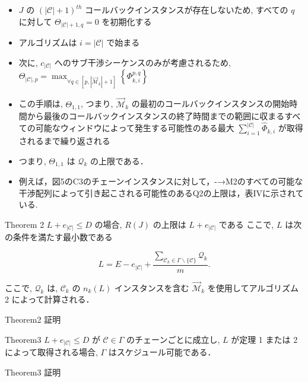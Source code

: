 \begin{frame}{}
    \begin{itemize}
        \item $J$ の $(|\mathcal{C}|+1)^{t h}$ コールバックインスタンスが存在しないため, すべての $q$ に対して $\Theta_{|\mathcal{C}|+1, q}=0$ を初期化する
        \item アルゴリズムは $i=|\mathcal{C}|$ で始まる
        \item 次に, $c_{|\mathcal{C}|}$ へのサブ干渉シーケンスのみが考慮されるため, $\Theta_{|\mathcal{C}|, p}=\max _{\forall q \in\left[p,\left|\overrightarrow{\mathcal{M}}_{k}\right|+1\right]}\left\{\Phi_{k, i}^{p, q}\right\}$
        \item この手順は, $\Theta_{1,1}$, つまり, $\overrightarrow{\mathcal{M}}_{k}$ の最初のコールバックインスタンスの開始時間から最後のコールバックインスタンスの終了時間までの範囲に収まるすべての可能なウィンドウによって発生する可能性のある最大 $\sum_{i=1}^{|\mathcal{C}|} \hat{\Phi}_{k, i}$ が取得されるまで繰り返される
        \item つまり, $\Theta_{1,1}$ は $\mathcal{Q}_{k}$ の上限である．
    \end{itemize}
\end{frame}

\begin{frame}{}
    \begin{itemize}
        \item 例えば，図5のC3のチェーンインスタンスに対して，-→M2のすべての可能な干渉配列によって引き起こされる可能性のあるQ2の上限は，表IVに示されている.
    \end{itemize}
\end{frame}

\begin{frame}{Theorem 2}
    $L+e_{|\mathcal{C}|} \leq D$ の場合, $R(J)$ の上限は $L+e_{|\mathcal{C}|}$ である
    ここで, $L$ は次の条件を満たす最小数である

    \begin{equation*}
        L=E-e_{|\mathcal{C}|}+\frac{\sum_{\mathcal{C}_{k} \in \Gamma \backslash\{\mathcal{C}\}} \mathcal{Q}_{k}}{m} .
    \end{equation*}

    ここで, $\mathcal{Q}_{k}$ は, $\mathcal{C}_{k}$ の $n_{k}(L)$ インスタンスを含む $\overrightarrow{\mathcal{M}}_{k}$ を使用してアルゴリズム 2 によって計算される．
\end{frame}

\begin{frame}{Theorem2 証明}
    \todo{}
\end{frame}

\begin{frame}{Theorem3}
    $L+e_{|\mathcal{C}|} \leq D$ が $\mathcal{C} \in \Gamma$ のチェーンごとに成立し, $L$ が定理 1 または 2 によって取得される場合, $\Gamma$ はスケジュール可能である．
\end{frame}

\begin{frame}{Theorem3 証明}
    \todo{}
\end{frame}
